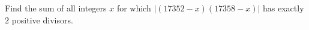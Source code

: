 Find the sum of all integers $x$ for which $\left|(17352-x)(17358-x)\right|$ has exactly $2$ positive divisors.
